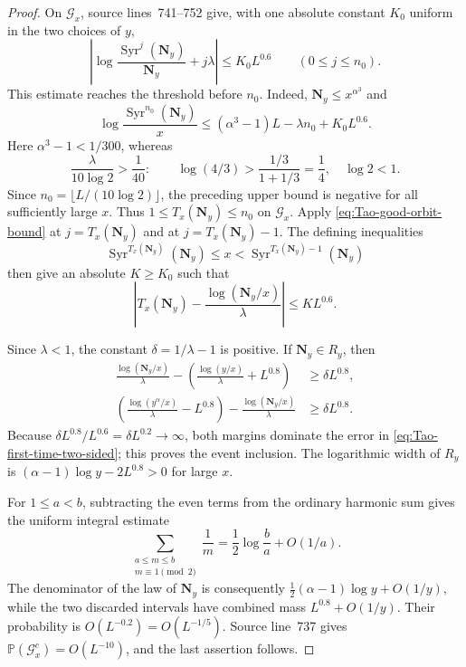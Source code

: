 \begin{proof}
On $\mathcal G_x$, source lines~741--752 give, with one absolute constant
$K_0$ uniform in the two choices of $y$,
\begin{equation}
 \label{eq:Tao-good-orbit-bound}
 \left|
  \log\frac{\operatorname{Syr}^{j}(\mathbf N_y)}{\mathbf N_y}
  +j\lambda
 \right|\leq K_0L^{0.6}
 \qquad(0\leq j\leq n_0).
\end{equation}
This estimate reaches the threshold before $n_0$.  Indeed,
$\mathbf N_y\leq x^{\alpha^3}$ and
\[
 \log\frac{\operatorname{Syr}^{n_0}(\mathbf N_y)}x
 \leq (\alpha^3-1)L-\lambda n_0+K_0L^{0.6}.
\]
Here $\alpha^3-1<1/300$, whereas
\[
 \frac{\lambda}{10\log2}>\frac1{40}:
 \qquad
 \log(4/3)>\frac{1/3}{1+1/3}=\frac14,
 \quad \log2<1.
\]
Since $n_0=\lfloor L/(10\log2)\rfloor$, the preceding upper bound is
negative for all sufficiently large $x$.  Thus $1\leq T_x(\mathbf N_y)\leq
n_0$ on $\mathcal G_x$.  Apply
\eqref{eq:Tao-good-orbit-bound} at $j=T_x(\mathbf N_y)$ and at
$j=T_x(\mathbf N_y)-1$.  The defining inequalities
\[
 \operatorname{Syr}^{T_x(\mathbf N_y)}(\mathbf N_y)\leq x
 <\operatorname{Syr}^{T_x(\mathbf N_y)-1}(\mathbf N_y)
\]
then give an absolute $K\geq K_0$ such that
\begin{equation}
 \label{eq:Tao-first-time-two-sided}
 \left|T_x(\mathbf N_y)-
       \frac{\log(\mathbf N_y/x)}{\lambda}\right|
 \leq KL^{0.6}.
\end{equation}

Since $\lambda<1$, the constant $\delta=1/\lambda-1$ is positive.  If
$\mathbf N_y\in R_y$, then
\begin{align*}
 \frac{\log(\mathbf N_y/x)}\lambda
 -\left(\frac{\log(y/x)}\lambda+L^{0.8}\right)
 &\geq \delta L^{0.8},\\
 \left(\frac{\log(y^\alpha/x)}\lambda-L^{0.8}\right)
 -\frac{\log(\mathbf N_y/x)}\lambda
 &\geq \delta L^{0.8}.
\end{align*}
Because $\delta L^{0.8}/L^{0.6}=\delta L^{0.2}\to\infty$, both margins
dominate the error in \eqref{eq:Tao-first-time-two-sided}; this proves the
event inclusion.  The logarithmic width of $R_y$ is
$(\alpha-1)\log y-2L^{0.8}>0$ for large $x$.

For $1\leq a<b$, subtracting the even terms from the ordinary harmonic sum
gives the uniform integral estimate
\[
 \sum_{\substack{a\leq m\leq b\\m\equiv1\pmod2}}\frac1m
 =\frac12\log\frac ba+O(1/a).
\]
The denominator of the law of $\mathbf N_y$ is consequently
$\frac12(\alpha-1)\log y+O(1/y)$, while the two discarded intervals have
combined mass $L^{0.8}+O(1/y)$.  Their probability is $O(L^{-0.2})=
O(L^{-1/5})$.  Source line~737 gives
$\mathbb P(\mathcal G_x^c)=O(L^{-10})$, and the last assertion follows.
\end{proof}

